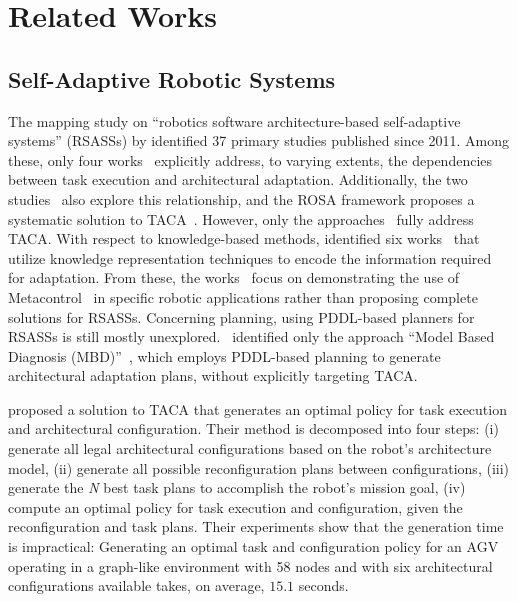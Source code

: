 \section{Related Works}\label{planta:sec:related}

\subsection{Self-Adaptive Robotic Systems}\label{planta:sec:related_sas}

The mapping study on ``robotics software architecture-based self-adaptive systems'' (RSASSs) by \citet{ALBERTS2025112258} identified 37 primary studies published since 2011. Among these, only four works~\cite{park2012task, runtime_variability_lotz, rra_nico, CAMARASoftwareArchitectureTask2020} explicitly address, to varying extents, the dependencies between task execution and architectural adaptation. Additionally, the two studies~\cite{braberman2018extended, temoto} also explore this relationship,  and the ROSA framework proposes a systematic solution to TACA~\cite{rosa}. However, only the approaches~\cite{braberman2018extended, CAMARASoftwareArchitectureTask2020,rosa} fully address TACA\@.
With respect to knowledge-based methods, \citet{ALBERTS2025112258} identified six works~\cite{park2012task, stefan_adaptive_runtime_models, graph_based_nico, p20_stefan_ice, p26_darko_jasper, suave} that utilize knowledge representation techniques to encode the information required for adaptation. From these, the works~\cite{p26_darko_jasper, suave} focus on demonstrating the use of Metacontrol~\cite{hernandez2018self, bozhinoski2022mros} in specific robotic applications rather than proposing complete solutions for RSASSs.
Concerning planning, using PDDL-based planners for RSASSs is still mostly unexplored.\  \citet{ALBERTS2025112258} identified only the approach \enquote{Model Based Diagnosis (MBD)}~\cite{zaman2013integrated, zaman2019fault}, which employs PDDL-based planning to generate architectural adaptation plans, without explicitly targeting TACA\@.

\citet{CAMARASoftwareArchitectureTask2020} proposed a solution to TACA that generates an optimal policy for task execution and architectural configuration. Their method is decomposed into four steps: (i) generate all legal architectural configurations based on the robot’s architecture model, (ii) generate all possible reconfiguration plans between configurations, (iii) generate the \emph{N} best task plans to accomplish the robot's mission goal, (iv) compute an optimal policy for task execution and configuration, given the reconfiguration and task plans. Their experiments show that the generation time is impractical: Generating an optimal task and configuration policy for an AGV operating in a graph-like environment with 58 nodes and with six architectural configurations available takes, on average, $15.1$ seconds.

